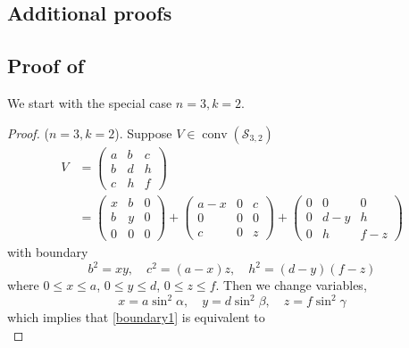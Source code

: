 \documentclass[11pt]{amsart}
\newcommand{\Szero}[2]{\ensuremath{\mathcal{S}_{#1,#2}}}
\theoremstyle{plain}
\theoremstyle{definition}
\theoremstyle{remark}
\DeclareMathOperator{\conv}{conv}
\begin{document}
	\begin{appendices}
		\section{Additional proofs}\label{Appendix_proof}
		
		\subsection{Proof of }\label{append:thm_special_case_k2}
		We start with the special case \(n=3,k=2\).
		\begin{proof}
			(\(n=3,k=2\)). Suppose $V \in \conv(\Szero{3}{2})$
			\begin{equation}
				\begin{split}
					V &=  \begin{pmatrix}
						a & b & c\\
						b & d & h\\
						c & h & f
					\end{pmatrix}\\
					& = 
					\begin{pmatrix}
						x & b & 0\\
						b & y & 0\\
						0 & 0 & 0    
					\end{pmatrix} + 
					\begin{pmatrix}
						a - x & 0 & c\\
						0 & 0 & 0\\
						c & 0 & z
					\end{pmatrix} + 
					\begin{pmatrix}
						0 & 0 & 0\\
						0 & d-y & h\\
						0 & h & f-z    
					\end{pmatrix}
				\end{split}
			\end{equation}
			with boundary
			\begin{equation}\label{boundary1}
				b^2 = xy,\quad c^2 =  (a-x)z,\quad h^2 =  (d-y)(f-z)
			\end{equation}
			where $0\leq x\leq a$, $0\leq y\leq d$, $0\leq z\leq f$.
			Then we change variables,
			\[
			x = a\sin^2\alpha,\quad y = d\sin^2\beta,\quad z = f\sin^2\gamma
			\]
			which implies that \eqref{boundary1} is equivalent to 
			\begin{equation}\label{boundary2}

\end{equation}
\end{proof}
\end{appendices}
\end{document}
